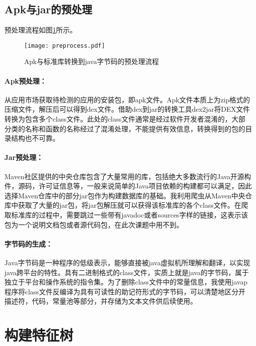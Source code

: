 \subsection{Apk与jar的预处理}

预处理流程如图\ref{fig:preprocess}所示。
\begin{figure}[!htp]
  \centering
  \texttt{[image: preprocess.pdf]} \\
  \caption{Apk与标准库转换到java字节码的预处理流程}
 \label{fig:preprocess}
\end{figure}

\paragraph{Apk预处理：}从应用市场获取待检测的应用的安装包，即apk文件。Apk文件本质上为zip格式的压缩文件，解压后可以得到dex文件。借助dex到jar的转换工具dex2jar\cite{d2j}将DEX文件转换为包含多个class文件。此处的class文件通常是经过软件开发者混淆的，大部分类的名称和函数的名称经过了混淆处理，不能提供有效信息，转换得到的包的目录结构也不可靠。


\paragraph{Jar预处理：}Maven社区提供的中央仓库\cite{maven}包含了大量常用的库，包括绝大多数流行的Java开源构件，源码，许可证信息等，一般来说简单的Java项目依赖的构建都可以满足，因此选择Maven仓库中的部分jar包作为构建数据库的基础。我利用爬虫从Maven中央仓库中获取了大量的jar包，将jar包解压就可以获得该标准库的各个class文件。在爬取标准库的过程中，需要跳过一些带有javadoc或者sources字样的链接，这表示该包为一个说明文档包或者源代码包，在此次课题中用不到。


\paragraph{字节码的生成：}Java字节码是一种程序的低级表示，能够直接被java虚拟机所理解和翻译，以实现java跨平台的特性。具有二进制格式的class文件，实质上就是java的字节码，属于独立于平台和操作系统的指令集。为了删除class文件中的常量信息，我使用javap程序将class文件反编译为具有可读性的助记符形式的字节码，可以清楚地区分开描述符，代码，常量池等部分，并存储为文本文件供后续使用。




\section{构建特征树}

